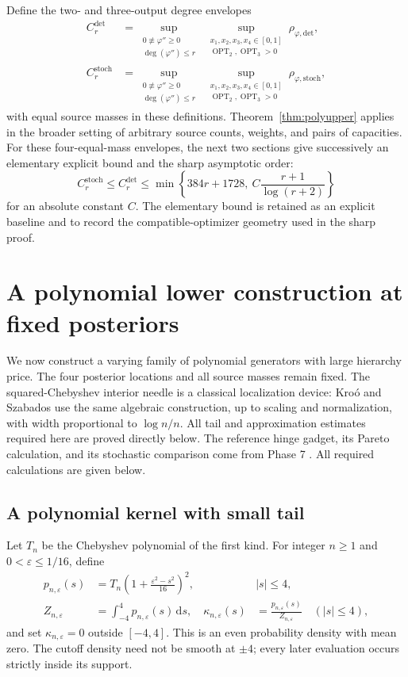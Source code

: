 \documentclass[11pt]{article}
\theoremstyle{definition}\newtheorem{definition}[theorem]{Definition}
\theoremstyle{remark}\newtheorem{remark}[theorem]{Remark}
\newcommand{\ph}{\varphi}
\newcommand{\OPT}{\operatorname{OPT}}
\newcommand{\rd}{\,\mathrm d}
\newcommand{\detp}{\mathrm{det}}
\newcommand{\stp}{\mathrm{stoch}}
\begin{document}
Define the two- and three-output degree envelopes
\begin{align}
C_r^{\detp}&=\sup_{\substack{0\not\equiv\ph''\ge0\\\deg(\ph'')\le r}}
\ \sup_{\substack{x_1,x_2,x_3,x_4\in[0,1]\\\OPT_2,\OPT_3>0}}
\rho_{\ph,\detp},\label{eq:envelope}\\
C_r^{\stp}&=\sup_{\substack{0\not\equiv\ph''\ge0\\\deg(\ph'')\le r}}
\ \sup_{\substack{x_1,x_2,x_3,x_4\in[0,1]\\\OPT_2,\OPT_3>0}}
\rho_{\ph,\stp},\nonumber
\end{align}
with equal source masses in these definitions. Theorem~\ref{thm:polyupper} applies in the broader setting of arbitrary source counts, weights, and pairs of capacities. For these four-equal-mass envelopes, the next two sections give successively an elementary explicit bound and the sharp asymptotic order:
\begin{equation}
C_r^{\stp}\le C_r^{\detp}
\le \min\left\{384r+1728,\ C\frac{r+1}{\log(r+2)}\right\}
\label{eq:envelopeupper}
\end{equation}
for an absolute constant $C$. The elementary bound is retained as an explicit baseline and to record the compatible-optimizer geometry used in the sharp proof.



\section{A polynomial lower construction at fixed posteriors}
\label{sec:lower}
We now construct a varying family of polynomial generators with large hierarchy price. The four posterior locations and all source masses remain fixed. The squared-Chebyshev interior needle is a classical localization device: Kro\'o and Szabados \cite[Proposition 1 and its proof]{krooszabados} use the same algebraic construction, up to scaling and normalization, with width proportional to $\log n/n$. All tail and approximation estimates required here are proved directly below. The reference hinge gadget, its Pareto calculation, and its stochastic comparison come from Phase 7 \cite[Section 4]{huang7}. All required calculations are given below.

\subsection{A polynomial kernel with small tail}
Let $T_n$ be the Chebyshev polynomial of the first kind. For integer $n\ge1$ and $0<\varepsilon\le1/16$, define
\begin{align}
p_{n,\varepsilon}(s)&=T_n\left(1+\frac{\varepsilon^2-s^2}{16}\right)^2,
&&|s|\le4,\label{eq:chebkernel}\\
Z_{n,\varepsilon}&=\int_{-4}^4p_{n,\varepsilon}(s)\rd s,
&\kappa_{n,\varepsilon}(s)&=\frac{p_{n,\varepsilon}(s)}{Z_{n,\varepsilon}}
\quad(|s|\le4),\nonumber
\end{align}
and set $\kappa_{n,\varepsilon}=0$ outside $[-4,4]$. This is an even probability density with mean zero. The cutoff density need not be smooth at $\pm4$; every later evaluation occurs strictly inside its support.
\end{document}
